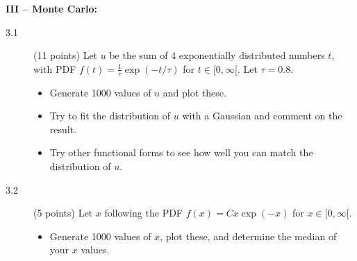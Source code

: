 \documentclass[11pt]{article}
\begin{document}
\newpage

\noindent
{\bf III -- Monte Carlo:}
\begin{description}
  \item[3.1] (11 points)
    Let $u$ be the sum of 4 exponentially distributed numbers $t$,
    with PDF $f(t) = \frac{1}{\tau} \exp(-t/\tau)$ for $t \in [0, \infty[$. Let $\tau = 0.8$.
  \vspace*{-1ex}
  \begin{itemize}
    \item Generate 1000 values of $u$ and plot these.
    \item Try to fit the distribution of $u$ with a Gaussian and comment on the result.
    \item Try other functional forms to see how well you can match the distribution of $u$.
  \end{itemize}
%
  \item[3.2] (5 points) Let $x$ following the PDF $f(x) = C x \exp(-x)$ for $x \in [0, \infty[$.
  \vspace*{-1ex}
  \begin{itemize}
    \item Generate 1000 values of $x$, plot these, and determine the median of your $x$ values.
  \end{itemize}
\end{description}


\end{document}

